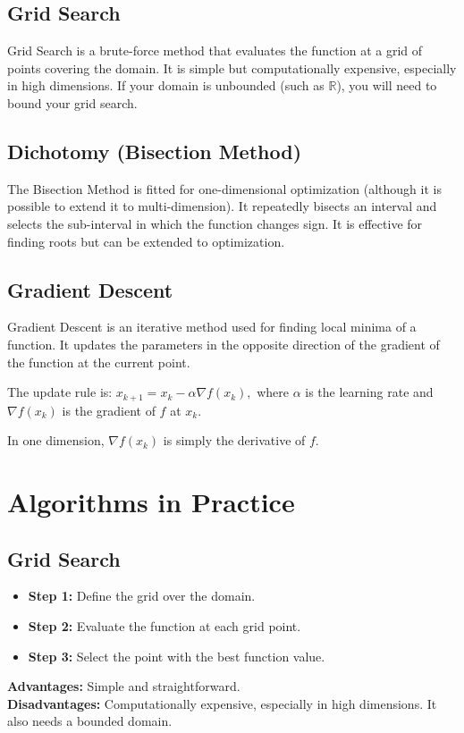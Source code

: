 \documentclass[]{article}
\newcommand{\R}{\mathbb{R}}
\begin{document}
	\subsection*{Grid Search}
	Grid Search is a brute-force method that evaluates the function at a grid of points covering the domain.
	It is simple but computationally expensive, especially in high dimensions.
	If your domain is unbounded (such as $\R$), you will need to bound your grid search.
	
	\subsection*{Dichotomy (Bisection Method)}
	The Bisection Method is fitted for one-dimensional optimization (although it is possible to extend it to multi-dimension).
	It repeatedly bisects an interval and selects the sub-interval in which the function changes sign.
	It is effective for finding roots but can be extended to optimization.
	
	\subsection*{Gradient Descent}
	Gradient Descent is an iterative method used for finding local minima of a function.
	It updates the parameters in the opposite direction of the gradient of the function at the current point. 
	
	The update rule is:
	$x_{k+1} = x_k - \alpha \nabla f(x_k),$
	where $\alpha$ is the learning rate and $\nabla f(x_k)$ is the gradient of $f$ at $x_k$.
	
	In one dimension, $\nabla f(x_k)$ is simply the derivative of $f$.
	
	\section*{Algorithms in Practice}
	\subsection*{Grid Search}
	\begin{itemize}
		\item \textbf{Step 1:} Define the grid over the domain.
		\item \textbf{Step 2:} Evaluate the function at each grid point.
		\item \textbf{Step 3:} Select the point with the best function value.
	\end{itemize}
	\textbf{Advantages:} Simple and straightforward.
	\\
	\textbf{Disadvantages:} Computationally expensive, especially in high dimensions.
	It also needs a bounded domain.
	
\end{document}
